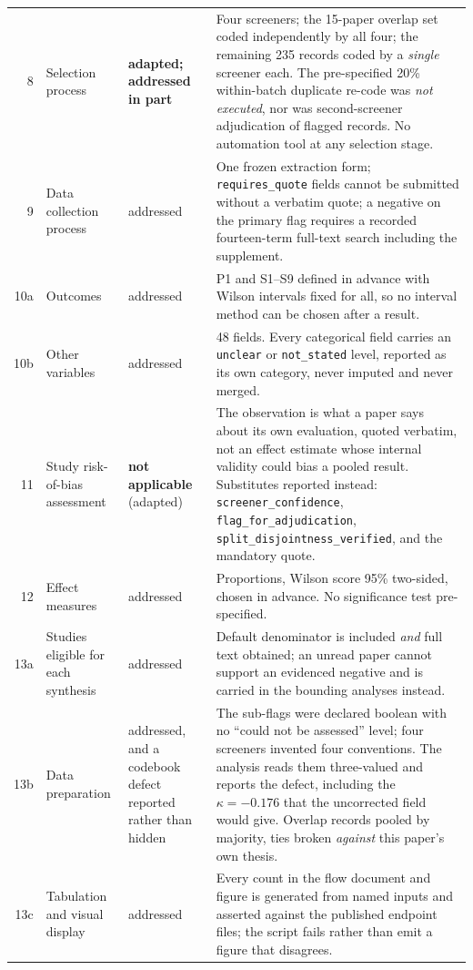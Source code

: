 \documentclass[11pt,a4paper]{article}
\begin{document}
{\begin{longtable}{@{}rL{3.5cm}L{2.6cm}L{6.2cm}@{}}
8 & Selection process & \textbf{adapted; addressed in part} & Four screeners; the 15-paper overlap set coded independently by all four; the remaining 235 records coded by a \emph{single} screener each. The pre-specified 20\% within-batch duplicate re-code was \emph{not executed}, nor was second-screener adjudication of flagged records. No automation tool at any selection stage. \\
9 & Data collection process & addressed & One frozen extraction form; \texttt{requires\_quote} fields cannot be submitted without a verbatim quote; a negative on the primary flag requires a recorded fourteen-term full-text search including the supplement. \\
10a & Outcomes & addressed & P1 and S1--S9 defined in advance with Wilson intervals fixed for all, so no interval method can be chosen after a result. \\
10b & Other variables & addressed & 48 fields. Every categorical field carries an \texttt{unclear} or \texttt{not\_stated} level, reported as its own category, never imputed and never merged. \\
11 & Study risk-of-bias assessment & \textbf{not applicable} (adapted) & The observation is what a paper says about its own evaluation, quoted verbatim, not an effect estimate whose internal validity could bias a pooled result. Substitutes reported instead: \texttt{screener\_confidence}, \texttt{flag\_for\_adjudication}, \texttt{split\_disjointness\_verified}, and the mandatory quote. \\
12 & Effect measures & addressed & Proportions, Wilson score 95\% two-sided, chosen in advance. No significance test pre-specified. \\
13a & Studies eligible for each synthesis & addressed & Default denominator is included \emph{and} full text obtained; an unread paper cannot support an evidenced negative and is carried in the bounding analyses instead. \\
13b & Data preparation & addressed, and a codebook defect reported rather than hidden & The sub-flags were declared boolean with no ``could not be assessed'' level; four screeners invented four conventions. The analysis reads them three-valued and reports the defect, including the $\kappa = -0.176$ that the uncorrected field would give. Overlap records pooled by majority, ties broken \emph{against} this paper's own thesis. \\
13c & Tabulation and visual display & addressed & Every count in the flow document and figure is generated from named inputs and asserted against the published endpoint files; the script fails rather than emit a figure that disagrees. \\

\end{longtable}}
\end{document}
